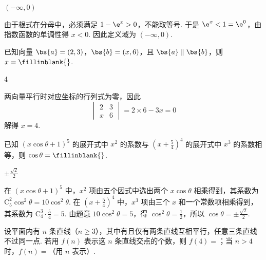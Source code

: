 \begin{answer}
\((- \infty,0)\)
\end{answer}

\begin{solution}
由于根式在分母中，必须满足 \(1-\e^x>0\)，不能取等号. 于是 \(\e^x<1=\e^0\)，由指数函数的单调性得 \(x<0\). 因此定义域为 \((-\infty,0)\).
\end{solution}

\begin{problem}
已知向量 \(\bs{a} = (2,3)\)，\(\bs{b} = (x,6)\)，且 \(\bs{a} \parallel \bs{b}\)，则 \(x =\fillinblank{}\).
\end{problem}

\begin{answer}
4
\end{answer}

\begin{solution}
两向量平行时对应坐标的行列式为零，因此
\[
\begin{vmatrix}2&3\\x&6\end{vmatrix}=2\times6-3x=0
\]
解得 \(x=4\).
\end{solution}

\begin{problem}
已知 \((x\cos \theta + 1)^5\) 的展开式中 \(x^2\) 的系数与 \(\left(x + \frac{5}{4}\right)^4\) 的展开式中 \(x^3\) 的系数相等，则 \(\cos \theta =\fillinblank{}\).
\end{problem}

\begin{answer}
\(\pm\frac{\sqrt{2}}{2}\)
\end{answer}

\begin{solution}
在 \((x\cos\theta+1)^5\) 中，\(x^2\) 项由五个因式中选出两个 \(x\cos\theta\) 相乘得到，其系数为 \(\mathrm C_5^2\cos^2\theta=10\cos^2\theta\). 在 \(\left(x+\frac54\right)^4\) 中，\(x^3\) 项由三个 \(x\) 和一个常数项相乘得到，其系数为 \(\mathrm C_4^3\cdot\frac54=5\). 由题意 \(10\cos^2\theta=5\)，得 \(\cos^2\theta=\frac12\)，所以 \(\cos\theta=\pm\frac{\sqrt2}{2}\).
\end{solution}

\begin{problem}
设平面内有 \(n\) 条直线（\(n \geqslant 3\)），其中有且仅有两条直线互相平行，任意三条直线不过同一点. 若用 \(f(n)\) 表示这 \(n\) 条直线交点的个数，则 \(f(4)=\)\fillinblank{}；当 \(n>4\) 时，\(f(n)=\)\fillinblank{}（用 \(n\) 表示）.
\end{problem}

